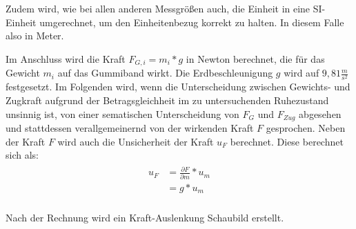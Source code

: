 \documentclass[class=article, crop=false]{standalone}
\newenvironment{Shaded}{\begin{snugshade}}{\end{snugshade}}
\newcommand{\CommentTok}[1]{\textcolor[rgb]{0.56,0.35,0.01}{\textit{#1}}}
\newcommand{\DecValTok}[1]{\textcolor[rgb]{0.00,0.00,0.81}{#1}}
\newcommand{\FloatTok}[1]{\textcolor[rgb]{0.00,0.00,0.81}{#1}}
\newcommand{\NormalTok}[1]{#1}
\newcommand{\OtherTok}[1]{\textcolor[rgb]{0.56,0.35,0.01}{#1}}
\newcommand{\SpecialCharTok}[1]{\textcolor[rgb]{0.00,0.00,0.00}{#1}}
\begin{document}
Zudem wird, wie bei allen anderen Messgrößen auch, die Einheit in eine
SI-Einheit umgerechnet, um den Einheitenbezug korrekt zu halten. In
diesem Falle also in Meter.

Im Anschluss wird die Kraft \(F_{G,i} = m_i * g\) in Newton berechnet,
die für das Gewicht \(m_i\) auf das Gummiband wirkt. Die
Erdbeschleunigung \(g\) wird auf \(9,81\frac{m}{s^2}\) festgesetzt. Im
Folgenden wird, wenn die Unterscheidung zwischen Gewichts- und Zugkraft
aufgrund der Betragsgleichheit im zu untersuchenden Ruhezustand unsinnig
ist, von einer sematischen Unterscheidung von \(F_G\) und \(F_{Zug}\)
abgesehen und stattdessen verallgemeinernd von der wirkenden Kraft \(F\)
gesprochen. Neben der Kraft \(F\) wird auch die Unsicherheit der Kraft
\(u_F\) berechnet. Diese berechnet sich als: \begin{align*}
\begin{split}
u_F &= \frac{\partial F}{\partial {m}}*u_m\\
    &= g*u_m\\
\end{split}
\end{align*}

Nach der Rechnung wird ein Kraft-Auslenkung Schaubild erstellt.

\begin{Shaded}
\end{Shaded}
\end{document}
